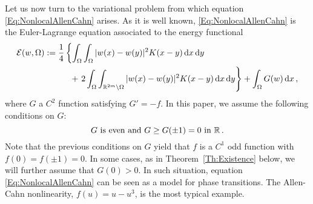 


%

Let us now turn to the variational problem from which equation \eqref{Eq:NonlocalAllenCahn} arises. As it is well known, \eqref{Eq:NonlocalAllenCahn} is the Euler-Lagrange equation associated to the energy functional
\begin{equation}
\label{Eq:Energy}
\begin{split}
\mathcal{E}(w, \Omega) &:= 
 \dfrac{1}{4} \left \{ \int_\Omega \int_\Omega |w(x) - w(y)|^2 K(x-y) \,\mathrm{d} x \,\mathrm{d} y \right. \qquad \qquad \\
& \quad \quad \quad +\left. 2 \int_\Omega \int_{\mathbb{R}^{2m} \setminus \Omega} |w(x) - w(y)|^2 K(x-y) \,\mathrm{d} x \,\mathrm{d} y \right \} + \int_{\Omega} G(w) \,\mathrm{d} x \,,
\end{split}
\end{equation}
where $G$ a $C^2$ function satisfying $G' = -f$. In this paper, we assume the following conditions on $G$:
\begin{equation}
\label{Eq:HipothesesG}
G \textrm{ is even and } G\geq G(\pm 1 )=0 \textrm{ in } \mathbb{R}\,.
\end{equation}
Note that the previous conditions on $G$ yield that $f$ is a $C^1$ odd function with $f(0)=f(\pm 1)=0$. In some cases, as in Theorem~\ref{Th:Existence} below, we will further assume that $G(0)>0$. In such situation, equation \eqref{Eq:NonlocalAllenCahn} can be seen as a model for phase transitions. The Allen-Cahn nonlinearity, $f(u) = u-u^3$, is the most typical example.


